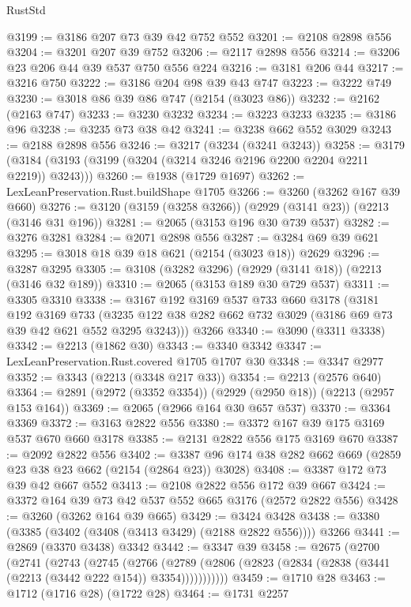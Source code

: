 \begin{lexlean}{RustStd}
\begin{coremodule}
@3199 := @3186 @207 @73 @39 @42 @752 @552
@3201 := @2108 @2898 @556
@3204 := @3201 @207 @39 @752
@3206 := @2117 @2898 @556
@3214 := @3206 @23 @206 @44 @39 @537 @750 @556 @224
@3216 := @3181 @206 @44
@3217 := @3216 @750
@3222 := @3186 @204 @98 @39 @43 @747
@3223 := @3222 @749
@3230 := @3018 @86 @39 @86 @747 (@2154 (@3023 @86))
@3232 := @2162 (@2163 @747)
@3233 := @3230 @3232
@3234 := @3223 @3233
@3235 := @3186 @96
@3238 := @3235 @73 @38 @42
@3241 := @3238 @662 @552 @3029
@3243 := @2188 @2898 @556
@3246 := @3217 (@3234 (@3241 @3243))
@3258 := @3179 (@3184 (@3193 (@3199 (@3204 (@3214 @3246 @2196 @2200 @2204 @2211 @2219)) @3243)))
@3260 := @1938 (@1729 @1697)
@3262 := LexLeanPreservation.Rust.buildShape @1705
@3266 := @3260 (@3262 @167 @39 @660)
@3276 := @3120 (@3159 (@3258 @3266)) (@2929 (@3141 @23)) (@2213 (@3146 @31 @196))
@3281 := @2065 (@3153 @196 @30 @739 @537)
@3282 := @3276 @3281
@3284 := @2071 @2898 @556
@3287 := @3284 @69 @39 @621
@3295 := @3018 @18 @39 @18 @621 (@2154 (@3023 @18)) @2629
@3296 := @3287 @3295
@3305 := @3108 (@3282 @3296) (@2929 (@3141 @18)) (@2213 (@3146 @32 @189))
@3310 := @2065 (@3153 @189 @30 @729 @537)
@3311 := @3305 @3310
@3338 := @3167
    @192
    @3169
    @537
    @733
    @660
    @3178
    (@3181
      @192
      @3169
      @733
      (@3235 @122 @38 @282 @662 @732 @3029 (@3186 @69 @73 @39 @42 @621 @552 @3295 @3243)))
    @3266
@3340 := @3090 (@3311 @3338)
@3342 := @2213 (@1862 @30)
@3343 := @3340 @3342
@3347 := LexLeanPreservation.Rust.covered @1705 @1707 @30
@3348 := @3347 @2977
@3352 := @3343 (@2213 (@3348 @217 @33))
@3354 := @2213 (@2576 @640)
@3364 := @2891 (@2972 (@3352 @3354)) (@2929 (@2950 @18)) (@2213 (@2957 @153 @164))
@3369 := @2065 (@2966 @164 @30 @657 @537)
@3370 := @3364 @3369
@3372 := @3163 @2822 @556
@3380 := @3372 @167 @39 @175 @3169 @537 @670 @660 @3178
@3385 := @2131 @2822 @556 @175 @3169 @670
@3387 := @2092 @2822 @556
@3402 := @3387 @96 @174 @38 @282 @662 @669 (@2859 @23 @38 @23 @662 (@2154 (@2864 @23)) @3028)
@3408 := @3387 @172 @73 @39 @42 @667 @552
@3413 := @2108 @2822 @556 @172 @39 @667
@3424 := @3372 @164 @39 @73 @42 @537 @552 @665 @3176 (@2572 @2822 @556)
@3428 := @3260 (@3262 @164 @39 @665)
@3429 := @3424 @3428
@3438 := @3380 (@3385 (@3402 (@3408 (@3413 @3429) (@2188 @2822 @556)))) @3266
@3441 := @2869 (@3370 @3438) @3342
@3442 := @3347 @39
@3458 := @2675
    (@2700
      (@2741
        (@2743
          (@2745
            (@2766
              (@2789 (@2806 (@2823 (@2834 (@2838 (@3441 (@2213 (@3442 @222 @154)) @3354)))))))))))
@3459 := @1710 @28
@3463 := @1712 (@1716 @28) (@1722 @28)
@3464 := @1731 @2257

\end{coremodule}
\end{lexlean}
